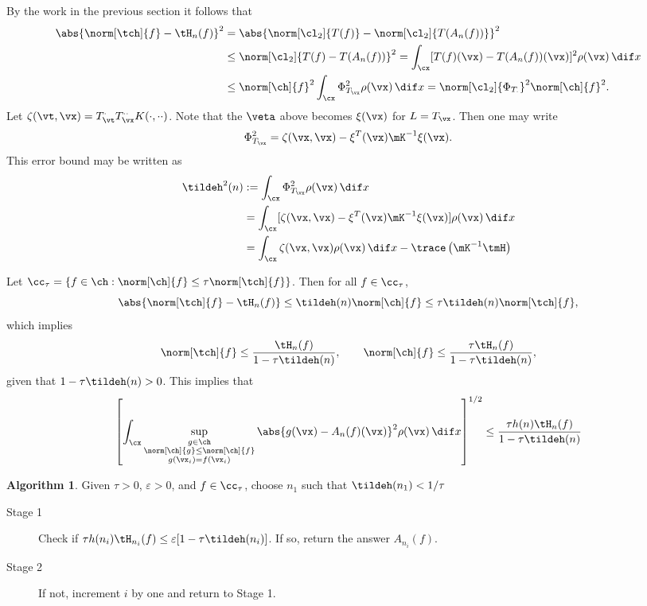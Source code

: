 \documentclass[11pt]{amsart}
\newcommand{\g}{\gamma}
\theoremstyle{definition}
\newtheorem{algo}{Algorithm}
\begin{document}
By the work in the previous section it follows that
\begin{align*}
\abs{\norm[\tch]{f} - \tH_n(f)}^2 &= \abs{\norm[\cl_2]{T(f)} - \norm[\cl_2]{T(A_n(f))}}^2\\
&\le  \norm[\cl_2]{T(f)-T(A_n(f))}^2 = \int_{\cx} [T(f)(\vx)-T(A_n(f))(\vx)]^2 \rho(\vx) \, \dif x\\
&\le \norm[\ch]{f}^2 \int_{\cx} \Phi_{T_{\vx}}^2  \rho(\vx) \, \dif x = \norm[\cl_2]{\Phi_{T_{\cdot}}}^2 \norm[\ch]{f}^2.
\end{align*}
Let $\zeta(\vt,\vx)=T^{\cdot}_{\vt}T^{\cdot\cdot}_{\vx}K(\cdot,\cdot\cdot)$.  Note that the $\veta$ above becomes $\xi(\vx)$ for $L=T_{\vx}$.  Then one may write
\[
\Phi_{T_{\vx}}^2 = \zeta(\vx,\vx) - \xi^T(\vx) \mK^{-1} \xi(\vx).
\]
This error bound may be written as
\begin{align*}
\tildeh^2(n) &:= \int_{\cx} \Phi_{T_{\vx}}^2  \rho(\vx) \, \dif x \\
&= \int_{\cx} [\zeta(\vx,\vx) - \xi^T(\vx) \mK^{-1} \xi(\vx)]  \rho(\vx) \, \dif x\\
&= \int_{\cx} \zeta(\vx,\vx) \rho(\vx) \, \dif x - \trace\left( \mK^{-1} \tmH \right)
\end{align*}

Let $\cc_{\tau}=\{ f \in \ch :  \norm[\ch]{f} \le \tau \norm[\tch]{f}\}$.  Then for all $f \in \cc_{\tau}$,
\[
\abs{\norm[\tch]{f} - \tH_n(f)} \le \tildeh (n) \norm[\ch]{f} \le \tau \tildeh (n) \norm[\tch]{f},
\]
which implies
\[
\norm[\tch]{f} \le \frac{\tH_n(f)}{1-\tau \tildeh(n)}, \qquad \norm[\ch]{f} \le \frac{\tau \tH_n(f)}{1-\tau \tildeh(n)},
\]
given that $1-\tau\tildeh(n)>0$. This implies that
\[
\left[\int_{\cx} \sup_{\substack{g \in \ch \\ \norm[\ch]{g} \le \norm[\ch]{f} \\g(\vx_i)=f(\vx_i) }} \abs{g(\vx) - A_n(f)(\vx)}^2 \rho(\vx) \, \dif x \right ]^{1/2} \le \frac{\tau h(n) \tH_n(f)}{1-\tau \tildeh(n)}
\]

\begin{algo}  Given $\tau>0$, $\varepsilon>0$, and $f \in \cc_\tau$, choose $n_1$ such that $\tildeh(n_1) < 1/\tau$

\begin{description}
\item[Stage 1] Check if $\tau h(n_i) \tH_{n_i}(f) \le \varepsilon[1-\tau \tildeh(n_i)]$.  If so, return the answer $A_{n_i}(f)$.

\item[Stage 2]  If not, increment $i$ by one and return to Stage 1.
\end{description}
\end{algo}
\end{document}
